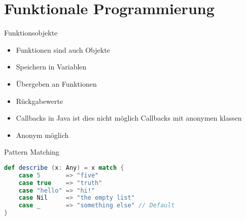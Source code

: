 \section{Funktionale Programmierung}

\begin{frame}[t]{Funktionsobjekte}

\begin{itemize}[<+->]
\item Funktionen sind auch Objekte
\item Speichern in Variablen
\item Übergeben an Funktionen
\item Rückgabewerte
\item Callbacks
 {in Java ist dies nicht möglich}
 {Callbacks mit anonymen klassen}
\item Anonym möglich
\end{itemize}

\end{frame}

\begin{frame}[fragile]{Pattern Matching}

\begin{lstlisting}[language=scala]
def describe (x: Any) = x match {
	case 5       => "five"
	case true    => "truth"
	case "hello" => "hi!"
	case Nil     => "the empty list"
	case _       => "something else" // Default
}
\end{lstlisting}

\end{frame}


